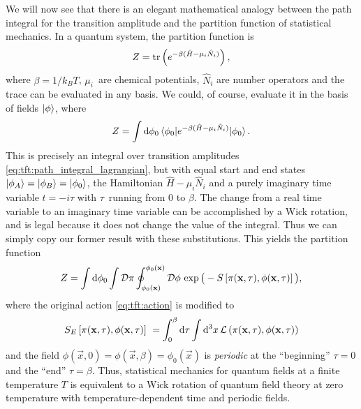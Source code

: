 We will now see that there is an elegant mathematical analogy between the path integral for the transition amplitude and the partition function of statistical mechanics.
In a quantum system, the partition function is
\begin{equation}
	Z = \text{tr} \left( e^{-\beta (\hat{H} - \mu_i \hat{N}_i)} \right) ,
\end{equation}
where $\beta = 1 / k_B T$, $\mu_i$ are chemical potentials, $\hat{N}_i$ are number operators and the trace can be evaluated in any basis.
We could, of course, evaluate it in the basis of fields $\ket{\phi}$, where
\begin{equation}
	Z = \int \mathop{}\!\mathrm{d} \phi_0 \braket{\phi_0 | e^{-\beta (\hat{H} - \mu_i \hat{N}_i)} | \phi_0} .
\end{equation}
This is precisely an integral over transition amplitudes \eqref{eq:tft:path_integral_lagrangian}, but with equal start and end states $\ket{\phi_A} = \ket{\phi_B} = \ket{\phi_0}$, the Hamiltonian $\hat{H} - \mu_i \hat{N}_i$ and a purely imaginary time variable $t = -i \tau$ with $\tau$ running from $0$ to $\beta$.
The change from a real time variable to an imaginary time variable can be accomplished by a Wick rotation, and is legal because it does not change the value of the integral.
Thus we can simply copy our former result with these substitutions.
This yields the partition function
\begin{equation}
	Z = \int \mathop{}\!\mathrm{d} \phi_0 \int \mathcal{D} \pi \oint_{\phi_0(\mathbf{x})}^{\phi_0(\mathbf{x})} \mathcal{D} \phi \, \exp \big( -S\left[ \pi(\mathbf{x}, \tau), \phi(\mathbf{x}, \tau) \right] \big) ,
\end{equation}
where the original action \eqref{eq:tft:action} is modified to
\begin{equation}
	S_E \left[ \pi(\vec{x}, \tau), \phi(\vec{x}, \tau) \right] = 
	\int_0^\beta \dif \tau \int \dif^3 x \, \lagr \left( \pi(\vec{x}, \tau), \phi(\vec{x}, \tau) \right)
\end{equation}
and the field $\phi(\vec{x}, 0) = \phi(\vec{x}, \beta) = \phi_0(\vec{x})$ is \emph{periodic} at the ``beginning'' $\tau = 0$ and the ``end'' $\tau = \beta$.
Thus, statistical mechanics for quantum fields at a finite temperature $T$ is equivalent to a Wick rotation of quantum field theory at zero temperature with temperature-dependent time and periodic fields.
